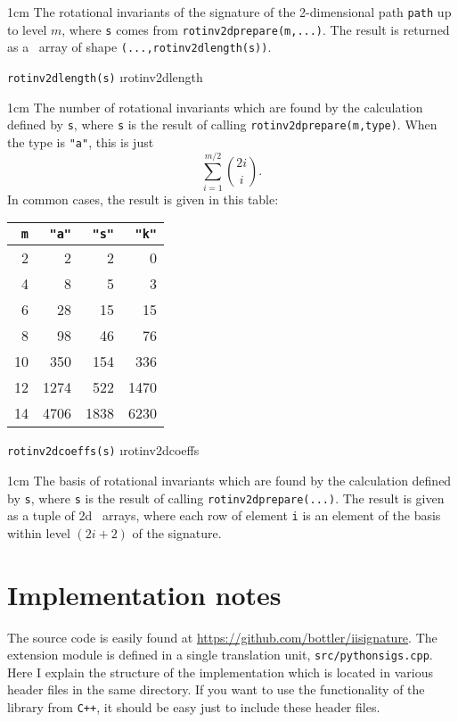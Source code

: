 \documentclass[a4paper]{extarticle}
\newenvironment{defn}{\begin{adjustwidth}{1cm}{}\ignorespaces}{\end{adjustwidth}\ignorespacesafterend}
\begin{document}
\begin{defn}
	\nopagebreak The rotational invariants of the signature of the 2-dimensional path \verb|path| up to level $m$, where \verb!s! comes from \verb!rotinv2dprepare(m,...)!. The result is returned as a \numpy\ array of shape \verb!(...,rotinv2dlength(s))!.
\end{defn}
\verb!rotinv2dlength(s)! \i{rotinv2dlength}

\begin{defn}
	\nopagebreak The number of rotational invariants which are found by the calculation defined by \verb!s!, where \verb!s! is the result of calling \verb!rotinv2dprepare(m,type)!. When the type is \verb|"a"|, this is just \[\sum_{i=1}^{m/2}\binom{2i}{i}.\] 
	In common cases, the result is given in this table:
\end{defn}


\begin{center}
\begin{tabular}{r|rrr}
\verb|m|&\verb|"a"|&\verb|"s"|&\verb|"k"|\\\hline
2&2&2&0\\
4&8&5&3\\
6&28&15&15\\
8&98&46&76\\
10&350&154&336\\
12&1274&522&1470\\
14&4706&1838&6230\\%
\end{tabular}
\end{center}

\newpage
\verb!rotinv2dcoeffs(s)! \i{rotinv2dcoeffs}
\begin{defn}
	\nopagebreak The basis of rotational invariants which are found by the calculation defined by \verb!s!, where \verb!s! is the result of calling \verb!rotinv2dprepare(...)!. The result is given as a tuple of 2d \numpy\ arrays, where each row of element \verb|i| is an element of the basis within level $(2i+2)$ of the signature.
	\end{defn}

\section{Implementation notes}
The source code is easily found at \url{https://github.com/bottler/iisignature}. The extension module is defined in a single translation unit, \verb|src/pythonsigs.cpp|. Here I explain the structure of the implementation which is located in various header files in the same directory. If you want to use the functionality of the library from \verb!C++!, it should be easy just to include these header files.
\end{document}

